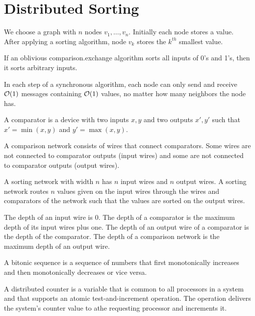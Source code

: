 \documentclass[11pt, oneside]{book}   						%
\begin{document}
\section{Distributed Sorting}
\begin{mydef}[Sorting] We choose a graph with $n$ nodes $v_1,\hdots, v_n$. Initially each node stores a value. After applying a sorting algorithm, node $v_k$ stores the $k^{th}$ smallest value.\end{mydef}
\begin{mydef} If an oblivious comparison.exchange algorithm sorts all inputs of 0's and 1's, then it sorts arbitrary inputs.\end{mydef}
\begin{mydef} In each step of a synchronous algorithm, each node can only send and receive $\mathcal{O}(1)$ messages containing $\mathcal{O}(1)$ values, no matter how many neighbors the node has.\end{mydef}
\begin{mydef}[Comparator] A comparator is a device with two inputs $x,y$ and two outputs $x',y'$ such that $x'=\min(x,y)$ and $y'=\max(x,y)$.\end{mydef}
\begin{mydef} A comparison network consists of wires that connect comparators. Some wires are not connected to comparator outputs (input wires) and some are not connected to comparator outputs (output wires).\end{mydef}
\begin{mydef} A sorting network with width $n$ has $n$ input wires and $n$ output wires. A sorting network routes $n$ values given on the input wires through the wires and comparators of the network such that the values are sorted on the output wires.\end{mydef}
\begin{mydef}[Depth] The depth of an input wire is 0. The depth of a comparator is the maximum depth of its input wires plus one. The depth of an output wire of a comparator is the depth of the comparator. The depth of a comparison network is the maximum depth of an output wire.\end{mydef}
\begin{mydef} A bitonic sequence is a sequence of numbers that first monotonically increases and then monotonically decreases or vice versa.\end{mydef}
\begin{mydef} A distributed counter is a variable that is common to all processors in a system and that supports an atomic test-and-increment operation. The operation delivers the system's counter value to athe requesting processor and increments it.\end{mydef}
\end{document}
